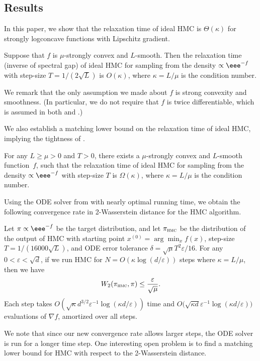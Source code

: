 \documentclass{toc}
\newcommand{\grad}{\nabla}
\newcommand{\eps}{\varepsilon}
\begin{document}
\subsection{Results}
In this paper, we show that the relaxation time of ideal HMC is $\Theta(\kappa)$ for strongly logconcave functions with Lipschitz gradient.  
\begin{theorem}\label{thm:rel_upper}
	Suppose that $f$ is $\mu$-strongly convex and $L$-smooth. Then the relaxation time (inverse of spectral gap) of ideal HMC for sampling from the density $\propto \eee^{-f}$ with step-size $T = 1/(2\sqrt{L})$ is $O(\kappa)$, 
	where $\kappa = L/\mu$ is the condition number. 
\end{theorem}

We remark that the only assumption we made about $f$ is strong convexity and
%
smoothness. (In particular,  %
we do not require that $f$ is twice differentiable, which is assumed in both \cite{LSV18} and \cite{MS17}.)   %

We also establish a matching lower bound on the relaxation time of ideal HMC, implying the tightness of . 
\begin{theorem}\label{thm:rel_lower}
	For any $L \ge \mu > 0$ and $T>0$, there exists a $\mu$-strongly convex and $L$-smooth function~$f$, such that the relaxation time of ideal HMC for sampling from the density $\propto \eee^{-f}$ with step-size $T$ is $\Omega(\kappa)$, where $\kappa = L/\mu$ is the condition number. 
\end{theorem}

Using the ODE solver from \cite{LSV18} with nearly optimal running time, we obtain the following convergence rate in 2-Wasserstein distance for the HMC algorithm. 
%
\begin{theorem}
	\label{thm:mixing}
	Let $\pi \propto \eee^{-f}$ be the target distribution, and let $\pi_{\textsc{hmc}}$ be the distribution of the output of HMC with starting point $x^{(0)} = \arg\min_x f(x)$, step-size $T = 1/(16000\sqrt{L})$, and 
	ODE error tolerance $\delta = \sqrt{\mu}T^2 \eps/16$.
	For any $0<\eps<\sqrt{d}$, if we run HMC for $N = O\left( \kappa \log(d/\eps) \right)$ steps where $\kappa = L/\mu$, then we have 
	\begin{equation}
	W_2(\pi_{\textsc{hmc}},\pi) \le \frac{\eps}{\sqrt{\mu}}.
	\end{equation}
	Each step takes $O\left( \sqrt{\kappa}d^{3/2}\eps^{-1} \log(\kappa d/\eps) \right)$ time and $O\big( \sqrt{\kappa d}\eps^{-1} \log(\kappa d/\eps) \big)$ evaluations of $\grad f$, amortized over all steps.
\end{theorem}
We note that since our new convergence rate allows larger steps, the ODE solver is run for a longer time step. 
One interesting open problem is to find a matching lower bound for HMC with respect to the 2-Wasserstein distance. 
\end{document}
